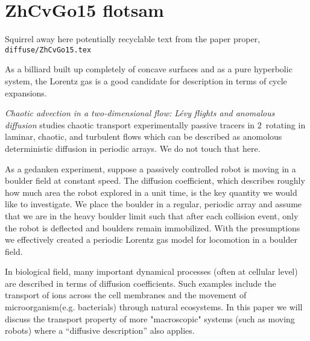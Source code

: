
\section{ZhCvGo15 flotsam}
\label{s:flotsam}

Squirrel away here potentially recyclable text from the
paper proper, \texttt{diffuse/ZhCvGo15.tex}


%

As a billiard built up completely of concave surfaces and as a pure
hyperbolic system, the Lorentz gas is a good candidate for description in
terms of cycle expansions.

                                                            \toCB
{} {\em Chaotic advection in a two-dimensional
flow: L\'evy flights and anomalous diffusion} studies chaotic transport
experimentally passive tracers in $2$\dmn\ rotating in laminar, chaotic,
and turbulent flows which can be described as anomolous deterministic
diffusion in periodic arrays. We do not touch that here.


%
%

As a gedanken experiment, suppose a passively controlled robot is moving
in a boulder field at constant speed. The diffusion coefficient, which
describes roughly how much area the robot explored in a unit time, is the
key quantity we would like to investigate. We place the boulder in a
regular, periodic array and assume that we are in the heavy boulder limit
such that after each collision event, only the robot is deflected and
boulders remain immobilized. With the presumptions we effectively created
a periodic Lorentz gas model for locomotion in a boulder
field.

In biological field,  many important dynamical processes (often at
cellular level) are described in  terms of diffusion coefficients. Such
examples include the transport of ions  across the cell
membranes and the movement of  microorganism(e.g.
bacterials) through natural  ecosystems. In this
paper we will discuss the transport  property of more "macroscopic"
systems (such as moving  robots) where a ``diffusive
description'' also applies.

